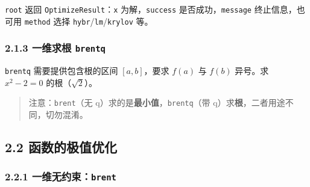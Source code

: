 \begin{Shaded}
\begin{Highlighting}[]
\end{Highlighting}
\end{Shaded}

\texttt{root} 返回 \texttt{OptimizeResult}：\texttt{x}
为解，\texttt{success} 是否成功，\texttt{message} 终止信息，也可用
\texttt{method} 选择 \texttt{hybr}/\texttt{lm}/\texttt{krylov} 等。

\subsubsection{\texorpdfstring{2.1.3 一维求根
\texttt{brentq}}{2.1.3 一维求根 brentq}}\label{ux4e00ux7ef4ux6c42ux6839-brentq}

\texttt{brentq} 需要提供包含根的区间 \([a,b]\)，要求 \(f(a)\) 与
\(f(b)\) 异号。求 \(x^2-2=0\) 的根（\(\sqrt2\)）。

\begin{Shaded}
\begin{Highlighting}[]
\OperatorTok{**} \OperatorTok{{-}} \NormalTok{, }\NormalTok{, }\NormalTok{))}
\end{Highlighting}
\end{Shaded}

\begin{Shaded}
\begin{Highlighting}[]
\end{Highlighting}
\end{Shaded}

\begin{quote}
注意：\texttt{brent}（无 q）求的是\textbf{最小值}，\texttt{brentq}（带
q）求\textbf{根}，二者用途不同，切勿混淆。
\end{quote}

\subsection{2.2
函数的极值优化}\label{ux51fdux6570ux7684ux6781ux503cux4f18ux5316}

\subsubsection{\texorpdfstring{2.2.1
一维无约束：\texttt{brent}}{2.2.1 一维无约束：brent}}\label{ux4e00ux7ef4ux65e0ux7ea6ux675fbrent}

